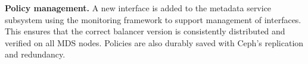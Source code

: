 \documentclass[10pt,twocolumn]{article}
\begin{document}
{\bf Policy management.} A new interface is added to the metadata service
subsystem using the monitoring framework to support management of interfaces.
This ensures that the correct balancer version is consistently distributed and
verified on all MDS nodes. Policies are also durably saved with Ceph's
replication and redundancy.

%

\end{document}

